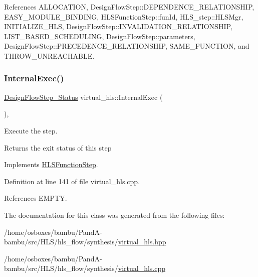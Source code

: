 References A\+L\+L\+O\+C\+A\+T\+I\+ON, Design\+Flow\+Step\+::\+D\+E\+P\+E\+N\+D\+E\+N\+C\+E\+\_\+\+R\+E\+L\+A\+T\+I\+O\+N\+S\+H\+IP, E\+A\+S\+Y\+\_\+\+M\+O\+D\+U\+L\+E\+\_\+\+B\+I\+N\+D\+I\+NG, H\+L\+S\+Function\+Step\+::fun\+Id, H\+L\+S\+\_\+step\+::\+H\+L\+S\+Mgr, I\+N\+I\+T\+I\+A\+L\+I\+Z\+E\+\_\+\+H\+LS, Design\+Flow\+Step\+::\+I\+N\+V\+A\+L\+I\+D\+A\+T\+I\+O\+N\+\_\+\+R\+E\+L\+A\+T\+I\+O\+N\+S\+H\+IP, L\+I\+S\+T\+\_\+\+B\+A\+S\+E\+D\+\_\+\+S\+C\+H\+E\+D\+U\+L\+I\+NG, Design\+Flow\+Step\+::parameters, Design\+Flow\+Step\+::\+P\+R\+E\+C\+E\+D\+E\+N\+C\+E\+\_\+\+R\+E\+L\+A\+T\+I\+O\+N\+S\+H\+IP, S\+A\+M\+E\+\_\+\+F\+U\+N\+C\+T\+I\+ON, and T\+H\+R\+O\+W\+\_\+\+U\+N\+R\+E\+A\+C\+H\+A\+B\+LE.

\mbox{\label{classvirtual__hls_adc3c37352b9e21cb7dc611f39b9b62bd}} 
\subsubsection{\texorpdfstring{Internal\+Exec()}{InternalExec()}}
{\footnotesize\ttfamily \hyperlink{design__flow__step_8hpp_afb1f0d73069c26076b8d31dbc8ebecdf}{Design\+Flow\+Step\+\_\+\+Status} virtual\+\_\+hls\+::\+Internal\+Exec (\begin{DoxyParamCaption}{ }\end{DoxyParamCaption})\hspace{0.3cm}{\ttfamily [override]}, {\ttfamily [virtual]}}



Execute the step. 

\begin{DoxyReturn}{Returns}
the exit status of this step 
\end{DoxyReturn}


Implements \hyperlink{classHLSFunctionStep_a8db4c00d080655984d98143206fc9fa8}{H\+L\+S\+Function\+Step}.



Definition at line 141 of file virtual\+\_\+hls.\+cpp.



References E\+M\+P\+TY.



The documentation for this class was generated from the following files\+:\begin{DoxyCompactItemize}
\item 
/home/osboxes/bambu/\+Pand\+A-\/bambu/src/\+H\+L\+S/hls\+\_\+flow/synthesis/\hyperlink{virtual__hls_8hpp}{virtual\+\_\+hls.\+hpp}\item 
/home/osboxes/bambu/\+Pand\+A-\/bambu/src/\+H\+L\+S/hls\+\_\+flow/synthesis/\hyperlink{virtual__hls_8cpp}{virtual\+\_\+hls.\+cpp}\end{DoxyCompactItemize}
